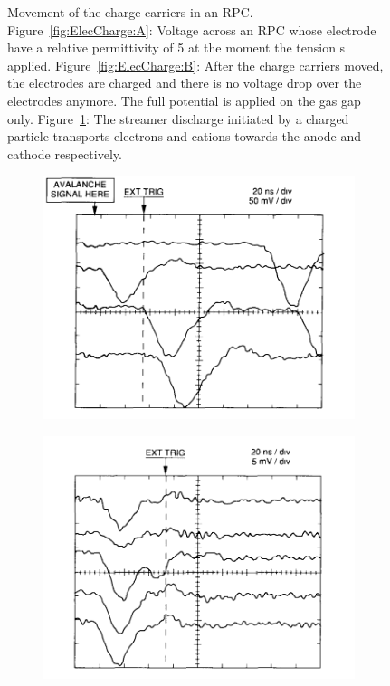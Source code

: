 \begin{figure}[H]
\begin{subfigure}{\linewidth}
			\caption{\label{fig:ElecCharge:C}}
		\end{subfigure}
		\caption{\label{fig:ElecCharge} Movement of the charge carriers in an RPC. Figure~\ref{fig:ElecCharge:A}: Voltage across an RPC whose electrode have a relative permittivity of 5 at the moment the tension s applied. Figure~\ref{fig:ElecCharge:B}: After the charge carriers moved, the electrodes are charged and there is no voltage drop over the electrodes anymore. The full potential is applied on the gas gap only. Figure~\ref{fig:ElecCharge:C}: The streamer discharge initiated by a charged particle transports electrons and cations towards the anode and cathode respectively.}
	\end{figure}
	
	\begin{figure}[H]
		\begin{subfigure}{0.5\linewidth}
			\centering
			\includegraphics[width = 0.5\plotwidth]{fig/chapt4/RPC_Streamer_Mode.png}
			\caption{\label{fig:ModeSignal:A}}
		\end{subfigure}
		\begin{subfigure}{0.5\linewidth}
			\centering
			\includegraphics[width = 0.5\plotwidth]{fig/chapt4/RPC_Avalanche_Mode.png}\\

\end{subfigure}
\end{figure}
